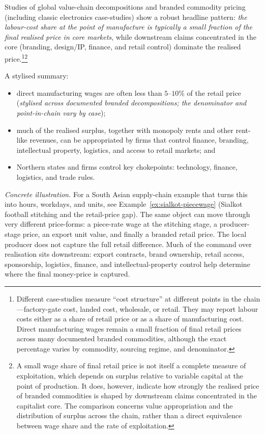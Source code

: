 Studies of global value-chain decompositions and branded commodity pricing (including classic electronics case-studies)\cite{Smith2016,Hickel2022,DedrickKraemerLinden2010}
show a robust headline pattern: \emph{the labour-cost share at the point of manufacture is typically a small fraction of the final realised price in core markets},
while downstream claims concentrated in the core (branding, design/IP, finance, and retail control) dominate the realised price.\footnote{Different case-studies measure ``cost structure'' at different
points in the chain---factory-gate cost, landed cost, wholesale, or retail.
They may report labour costs either as a share of retail price or as a share
of manufacturing cost. Direct manufacturing wages remain a small fraction
of final retail prices across many documented branded commodities, although
the exact percentage varies by commodity, sourcing regime, and denominator.}\footnote{A small wage share of final retail price is not itself a complete
measure of exploitation, which depends on surplus relative to variable
capital at the point of production. It does, however, indicate how strongly
the realised price of branded commodities is shaped by downstream claims
concentrated in the capitalist core. The comparison concerns value
appropriation and the distribution of surplus across the chain, rather than
a direct equivalence between wage share and the rate of exploitation.}

A stylised summary:

\begin{itemize}[leftmargin=1.5em]
  \item direct manufacturing wages are often less than \(5\)–\(10\%\) of the retail price
  (\emph{stylised across documented branded decompositions; the denominator and point-in-chain vary by case});
  \item much of the realised surplus, together with monopoly rents and other rent-like revenues, can be appropriated by firms that control finance, branding, intellectual property, logistics, and access to retail markets; and
  \item Northern states and firms control key chokepoints: technology, finance, logistics, and trade rules.\cite{Smith2016,Hickel2022}
\end{itemize}

\noindent\textit{Concrete illustration.} For a South Asian supply-chain example that turns this into
hours, workdays, and units, see Example~\ref{ex:sialkot-piecewage} (Sialkot
football stitching and the retail-price gap). The same object can move through
very different price-forms: a piece-rate wage at the stitching stage, a
producer-stage price, an export unit value, and finally a branded retail price.
The local producer does not capture the full retail difference. Much of the command
over realisation sits downstream: export contracts, brand ownership, retail access,
sponsorship, logistics, finance, and intellectual-property control help determine
where the final money-price is captured.

